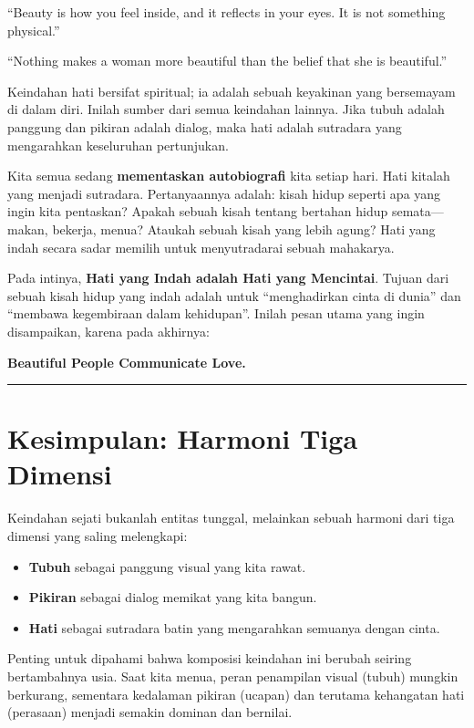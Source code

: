 \documentclass[
  letterpaper,
  DIV=11,
  numbers=noendperiod]{scrreprt}
\begin{document}
``Beauty is how you feel inside, and it reflects in your eyes. It is not
something physical.''

``Nothing makes a woman more beautiful than the belief that she is
beautiful.''

Keindahan hati bersifat spiritual; ia adalah sebuah keyakinan yang
bersemayam di dalam diri. Inilah sumber dari semua keindahan lainnya.
Jika tubuh adalah panggung dan pikiran adalah dialog, maka hati adalah
sutradara yang mengarahkan keseluruhan pertunjukan.

Kita semua sedang \textbf{mementaskan autobiografi} kita setiap hari.
Hati kitalah yang menjadi sutradara. Pertanyaannya adalah: kisah hidup
seperti apa yang ingin kita pentaskan? Apakah sebuah kisah tentang
bertahan hidup semata---makan, bekerja, menua? Ataukah sebuah kisah yang
lebih agung? Hati yang indah secara sadar memilih untuk menyutradarai
sebuah mahakarya.

Pada intinya, \textbf{Hati yang Indah adalah Hati yang Mencintai}.
Tujuan dari sebuah kisah hidup yang indah adalah untuk ``menghadirkan
cinta di dunia'' dan ``membawa kegembiraan dalam kehidupan''. Inilah
pesan utama yang ingin disampaikan, karena pada akhirnya:

\textbf{Beautiful People Communicate Love.}

\begin{center}\rule{0.5\linewidth}{0.5pt}\end{center}

\section{Kesimpulan: Harmoni Tiga
Dimensi}\label{kesimpulan-harmoni-tiga-dimensi}

Keindahan sejati bukanlah entitas tunggal, melainkan sebuah harmoni dari
tiga dimensi yang saling melengkapi:

\begin{itemize}
\item
  \textbf{Tubuh} sebagai panggung visual yang kita rawat.
\item
  \textbf{Pikiran} sebagai dialog memikat yang kita bangun.
\item
  \textbf{Hati} sebagai sutradara batin yang mengarahkan semuanya dengan
  cinta.
\end{itemize}

Penting untuk dipahami bahwa komposisi keindahan ini berubah seiring
bertambahnya usia. Saat kita menua, peran penampilan visual (tubuh)
mungkin berkurang, sementara kedalaman pikiran (ucapan) dan terutama
kehangatan hati (perasaan) menjadi semakin dominan dan bernilai.
\end{document}
